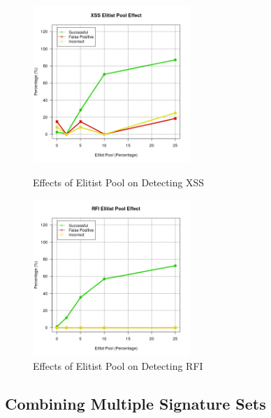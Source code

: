 \begin{appendices}
\begin{figure}[hp]
	\centering
	\includegraphics[height=225px]{./assets/appendix/fullresults/ga/elitist/Results_XSS.png}
	\caption{Effects of Elitist Pool on Detecting XSS}
	\includegraphics[height=225px]{./assets/appendix/fullresults/ga/elitist/Results_RFI.png}
	\caption{Effects of Elitist Pool on Detecting RFI}
\end{figure}

\newpage
\subsection{Combining Multiple Signature Sets} \label{app:resIteration}


\end{appendices}
